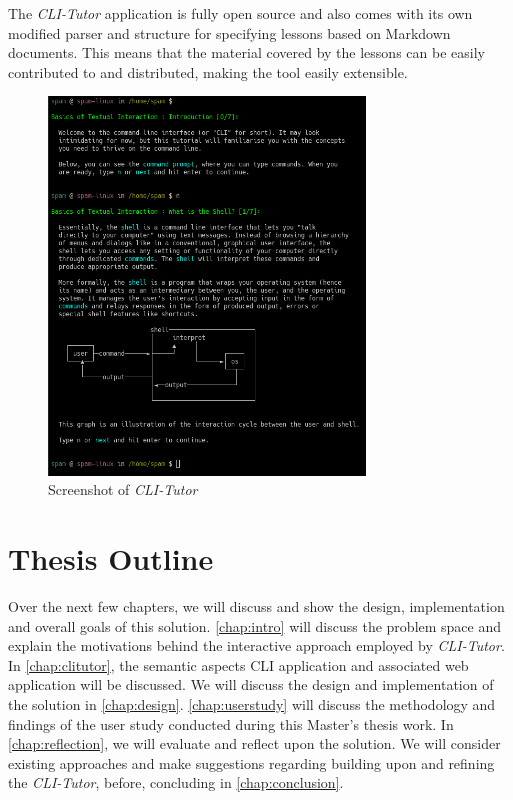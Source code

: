 The \textit{CLI-Tutor} application is fully open source and also comes with its
own modified parser and structure for specifying lessons based on Markdown
documents. This means that the material covered by the lessons can be easily
contributed to and distributed, making the tool easily extensible.


\begin{figure}[H]
	\centering
	\includegraphics[width=0.75\textwidth]{img/clitutor}
	\caption{Screenshot of \textit{CLI-Tutor}}
	\label{fig:clitutor}
\end{figure}

\section{Thesis Outline}

Over the next few chapters, we will discuss and show the design, implementation
and overall goals of this solution. \autoref{chap:intro} will discuss the
problem space and explain the motivations behind the interactive approach
employed by \textit{CLI-Tutor}. In \autoref{chap:clitutor}, the semantic
aspects CLI application and associated web application will be discussed. We
will discuss the design and implementation of the solution in
\autoref{chap:design}. \autoref{chap:userstudy} will discuss the methodology
and findings of the user study conducted during this Master's thesis work. In
\autoref{chap:reflection}, we will evaluate and reflect upon the solution. We
will consider existing approaches and make suggestions regarding building upon
and refining the \textit{CLI-Tutor}, before, concluding in
\autoref{chap:conclusion}.


